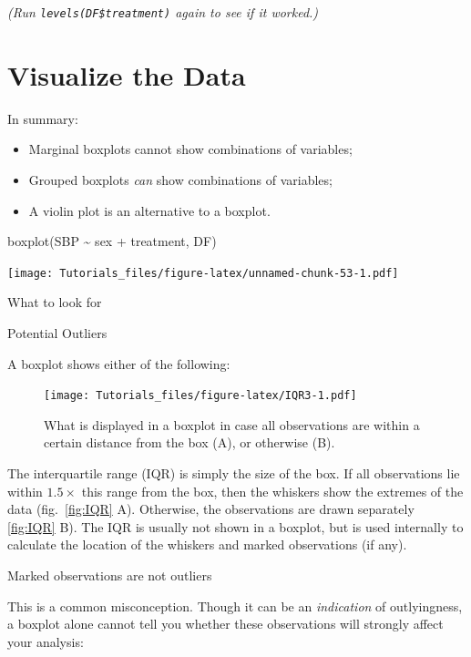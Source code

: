 \documentclass[
]{book}
\newenvironment{Shaded}{\begin{snugshade}}{\end{snugshade}}
\newcommand{\FunctionTok}[1]{\textcolor[rgb]{0.00,0.00,0.00}{#1}}
\newcommand{\NormalTok}[1]{#1}
\newcommand{\SpecialCharTok}[1]{\textcolor[rgb]{0.00,0.00,0.00}{#1}}
\providecommand{\tightlist}{%
  \setlength{\itemsep}{0pt}\setlength{\parskip}{0pt}}
\begin{document}
\emph{(Run \texttt{levels(DF\$treatment)} again to see if it worked.)}

\hypertarget{vis-ANOVA}{%
\section{Visualize the Data}\label{vis-ANOVA}}

In summary:

\begin{itemize}
\tightlist
\item
  Marginal boxplots cannot show combinations of variables;
\item
  Grouped boxplots \emph{can} show combinations of variables;
\item
  A violin plot is an alternative to a boxplot.
\end{itemize}

\begin{Shaded}
\begin{Highlighting}[]
\FunctionTok{boxplot}\NormalTok{(SBP }\SpecialCharTok{\textasciitilde{}}\NormalTok{ sex }\SpecialCharTok{+}\NormalTok{ treatment, DF)}
\end{Highlighting}
\end{Shaded}

\texttt{[image: Tutorials\_files/figure-latex/unnamed-chunk-53-1.pdf]}

What to look for

Potential Outliers

A boxplot shows either of the following:

\begin{figure}
\centering
\texttt{[image: Tutorials\_files/figure-latex/IQR3-1.pdf]}
\caption{\label{fig:IQR3}What is displayed in a boxplot in case all observations are within a certain distance from the box (A), or otherwise (B).}
\end{figure}

The interquartile range (IQR) is simply the size of the box. If all observations lie within \(1.5\times\) this range from the box, then the whiskers show the extremes of the data (fig.~\ref{fig:IQR} A). Otherwise, the observations are drawn separately \ref{fig:IQR} B). The IQR is usually not shown in a boxplot, but is used internally to calculate the location of the whiskers and marked observations (if any).

Marked observations are not outliers

This is a common misconception. Though it can be an \emph{indication} of outlyingness, a boxplot alone cannot tell you whether these observations will strongly affect your analysis:
\end{document}
